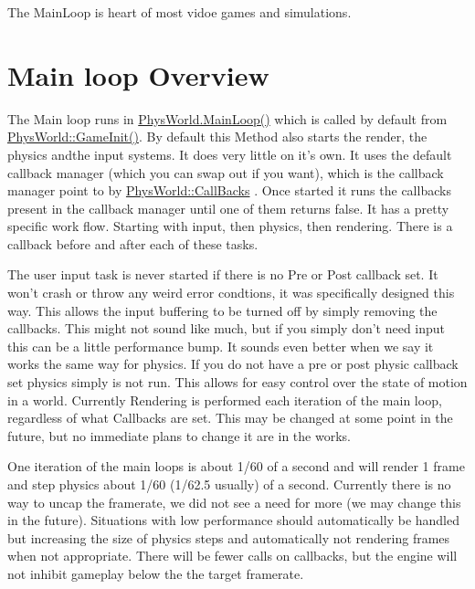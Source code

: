 The MainLoop is heart of most vidoe games and simulations.\hypertarget{mainloop1_overview1}{}\section{Main loop Overview}\label{mainloop1_overview1}
The Main loop runs in \hyperlink{classPhysWorld_ad41cad0347b6f5ba7ec05568aaffa514}{PhysWorld.MainLoop()} which is called by default from \hyperlink{classPhysWorld_afc5116f97cc1e91e899d1a1ca7e14e9b}{PhysWorld::GameInit()}. By default this Method also starts the render, the physics andthe input systems. It does very little on it's own. It uses the default callback manager (which you can swap out if you want), which is the callback manager point to by \hyperlink{classPhysWorld_a080ea6f1584374b07d3c1f29c7ed64df}{PhysWorld::CallBacks} . Once started it runs the callbacks present in the callback manager until one of them returns false. It has a pretty specific work flow. Starting with input, then physics, then rendering. There is a callback before and after each of these tasks. \par
 \par
 The user input task is never started if there is no Pre or Post callback set. It won't crash or throw any weird error condtions, it was specifically designed this way. This allows the input buffering to be turned off by simply removing the callbacks. This might not sound like much, but if you simply don't need input this can be a little performance bump. It sounds even better when we say it works the same way for physics. If you do not have a pre or post physic callback set physics simply is not run. This allows for easy control over the state of motion in a world. Currently Rendering is performed each iteration of the main loop, regardless of what Callbacks are set. This may be changed at some point in the future, but no immediate plans to change it are in the works. \par
 \par
 One iteration of the main loops is about 1/60 of a second and will render 1 frame and step physics about 1/60 (1/62.5 usually) of a second. Currently there is no way to uncap the framerate, we did not see a need for more (we may change this in the future). Situations with low performance should automatically be handled but increasing the size of physics steps and automatically not rendering frames when not appropriate. There will be fewer calls on callbacks, but the engine will not inhibit gameplay below the the target framerate. \par
